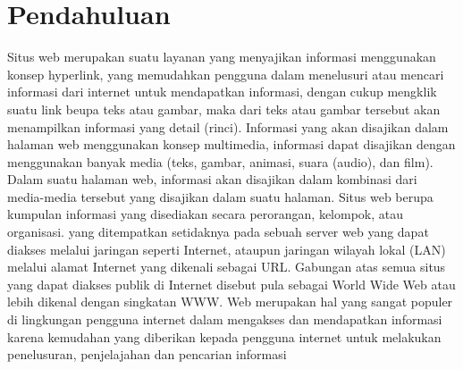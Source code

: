 \section{Pendahuluan}
	Situs web merupakan suatu layanan yang menyajikan informasi menggunakan konsep hyperlink, yang memudahkan pengguna dalam menelusuri atau mencari informasi dari internet untuk mendapatkan informasi, dengan cukup mengklik suatu link beupa teks atau gambar, maka dari teks atau gambar tersebut akan menampilkan informasi yang detail (rinci).
Informasi yang akan disajikan dalam halaman web menggunakan konsep multimedia, informasi dapat disajikan dengan menggunakan banyak media (teks, gambar, animasi, suara (audio), dan film). Dalam suatu halaman web, informasi akan disajikan dalam kombinasi dari media-media tersebut yang disajikan dalam suatu halaman.
	Situs web berupa kumpulan informasi yang disediakan secara perorangan, kelompok, atau organisasi. yang ditempatkan setidaknya pada sebuah server web yang dapat diakses melalui jaringan seperti Internet, ataupun jaringan wilayah lokal (LAN) melalui alamat Internet yang dikenali sebagai URL. Gabungan atas semua situs yang dapat diakses publik di Internet disebut pula sebagai World Wide Web atau lebih dikenal dengan singkatan WWW. Web merupakan hal yang sangat populer di lingkungan pengguna internet dalam mengakses dan mendapatkan informasi karena kemudahan yang diberikan kepada pengguna internet untuk melakukan penelusuran, penjelajahan dan pencarian informasi    
